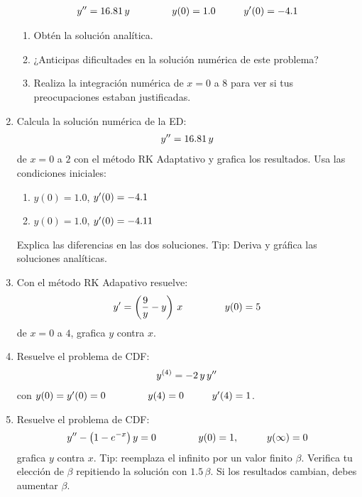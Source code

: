\begin{enumerate}
\begin{align*}
{y}^{\prime \prime} = 16.81 \, y \hspace{1.5cm} y (0) = 1.0 \hspace{1cm} {y}^{\prime} (0) = -4.1
\end{align*}
\begin{enumerate}
\item Obtén la solución analítica.
\item ¿Anticipas dificultades en la solución numérica de este problema?
\item Realiza la integración numérica de $x = 0$ a $8$ para ver si tus preocupaciones estaban justificadas.
\end{enumerate}
\item Calcula la solución numérica de la ED:
\begin{align*}
{y}^{\prime \prime} = 16.81 \, y
\end{align*}
de $x = 0$ a $2$ con el método RK Adaptativo y grafica los resultados. Usa las condiciones iniciales:
\begin{enumerate}
\item $y (0) = 1.0$, ${y}^{\prime} (0) = -4.1$
\item $y (0) = 1.0$, ${y}^{\prime} (0) = -4.11$
\end{enumerate} 
Explica las diferencias en las dos soluciones. Tip: Deriva y gráfica las soluciones analíticas.
\item Con el método RK Adapativo resuelve:
\begin{align*}
{y}^{\prime} = \left( \dfrac{9}{y} - y \right)  \, x \hspace{1.5cm} y (0) = 5
\end{align*}
de $x = 0$ a $4$, grafica $y$ contra $x$.
\item Resuelve el problema de CDF:
\begin{align*}
{y}^{(4)} = -2 \, y \, {y}^{\prime \prime}
\end{align*}
con $y (0) = {y}^{\prime} (0) = 0 \hspace{1.5cm} y (4) = 0 \hspace{1cm} {y}^{\prime} (4) = 1$.
\item Resuelve el problema de CDF:
\begin{align*}
{y}^{\prime \prime} - \big( 1 - e^{-x} \big) \, y = 0 \hspace{1.5cm} y (0) = 1, \hspace{1cm} y (\infty) = 0
\end{align*}
grafica $y$ contra $x$. Tip: reemplaza el infinito por un valor finito $\beta$. Verifica tu elección de $\beta$ repitiendo la solución con $1.5 \, \beta$. Si los resultados cambian, debes aumentar $\beta$.

\end{enumerate}
